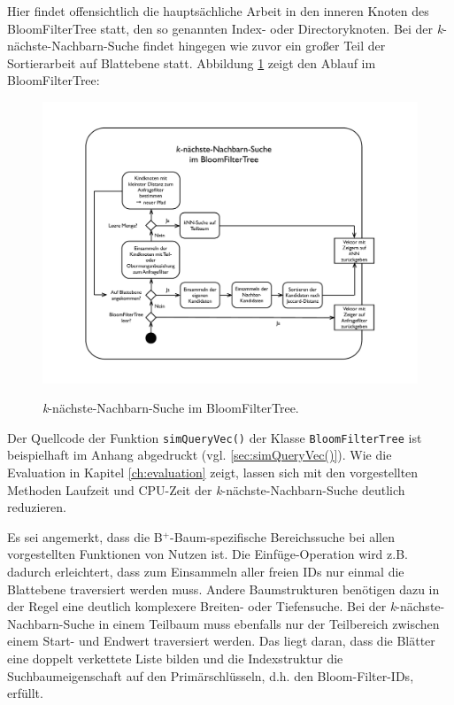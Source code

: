 Hier findet offensichtlich die hauptsächliche Arbeit in den inneren Knoten des BloomFilterTree statt, den so genannten Index- oder Directoryknoten. Bei der \textit{k}-nächste-Nachbarn-Suche findet hingegen wie zuvor ein großer Teil der Sortierarbeit auf Blattebene statt. Abbildung \ref{fig:pic8} zeigt den Ablauf im BloomFilterTree: 
\begin{figure}[hpbt]
  \centering
  \includegraphics[scale=0.5]{pictures/knn.pdf}\\
  \caption[\textit{k}-nächste-Nachbarn-Suche im BloomFilterTree]{\textit{k}-nächste-Nachbarn-Suche im BloomFilterTree.}\label{fig:pic8}
\end{figure}
Der Quellcode der Funktion \mbox{\texttt{simQueryVec()}} der Klasse \texttt{BloomFilterTree} ist beispielhaft im Anhang abgedruckt (vgl. \ref{sec:simQueryVec()}). Wie die Evaluation in Kapitel \ref{ch:evaluation} zeigt, lassen sich mit den vorgestellten Methoden Laufzeit und CPU-Zeit der \textit{k}-nächste-Nachbarn-Suche deutlich reduzieren. 

Es sei angemerkt, dass die B$^+$-Baum-spezifische Bereichssuche bei allen vorgestellten Funktionen von Nutzen ist. Die Einfüge-Operation wird z.B. dadurch erleichtert, dass zum Einsammeln aller freien IDs nur einmal die Blattebene traversiert werden muss. Andere Baumstrukturen benötigen dazu in der Regel eine deutlich komplexere Breiten- oder Tiefensuche. Bei der \textit{k}-nächste-Nachbarn-Suche in einem Teilbaum muss ebenfalls nur der Teilbereich zwischen einem Start- und Endwert traversiert werden. Das liegt daran, dass die Blätter eine doppelt verkettete Liste bilden und die Indexstruktur die Suchbaumeigenschaft auf den Primärschlüsseln, d.h. den Bloom-Filter-IDs, erfüllt.  
